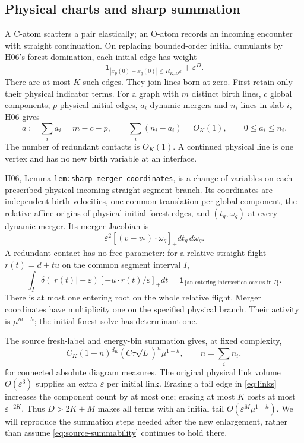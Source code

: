 \documentclass[11pt]{article}
\newcommand{\eps}{\varepsilon}
\newcommand{\ind}{\mathbf1}
\newcommand{\dd}{\,d}
\theoremstyle{definition}\newtheorem{definition}[theorem]{Definition}
\theoremstyle{remark}\newtheorem{remark}[theorem]{Remark}
\numberwithin{equation}{section}
\begin{document}
\subsection{Physical charts and sharp summation}\label{subsec:charts}
A C-atom scatters a pair elastically; an O-atom records an incoming encounter
with straight continuation. On replacing bounded-order initial cumulants
by H06's forest domination, each initial edge has weight
\begin{equation}\label{eq:links}
 \ind_{|x_p(0)-x_q(0)|\le R_{K,D}\eps}+\eps^D.
\end{equation}
There are at most $K$ such edges. They join lines born at zero.
First retain only their physical indicator terms. For a graph with $m$
distinct birth lines, $c$ global components, $p$ physical initial edges,
$a_i$ dynamic mergers and $n_i$ lines in slab $i$, H06 gives
\begin{equation}\label{eq:forestcounts}
 a:=\sum_i a_i=m-c-p,\qquad
 \sum_i(n_i-a_i)=O_K(1),\qquad 0\le a_i\le n_i.
\end{equation}
The number of redundant contacts is $O_K(1)$. A continued physical line
is one vertex and has no new birth variable at an interface.

H06, Lemma \texttt{lem:sharp-merger-coordinates}, is a change of variables
on each prescribed physical incoming straight-segment branch. Its coordinates
are independent birth velocities, one common translation per global
component, the relative affine origins of physical initial forest edges,
and $(t_g,\omega_g)$ at every dynamic merger. Its merger Jacobian is
\begin{equation}\label{eq:jacobian}
 \eps^2[(v-v_*)\cdot\omega_g]_+dt_g\dd\omega_g.
\end{equation}
A redundant contact has no free parameter: for a relative straight flight
$r(t)=d+tu$ on the common segment interval $I$,
\begin{equation}\label{eq:redundant}
 \int_I\delta(|r(t)|-\eps)[-u\cdot r(t)/\eps]_+dt
   =\ind_{\{\text{an entering intersection occurs in }I\}}.
\end{equation}
There is at most one entering root on the whole relative flight. Merger
coordinates have multiplicity one on the specified physical branch. Their
activity is $\mu^{m-h}$; the initial forest solve has determinant one.

The source fresh-label and energy-bin summation gives, at fixed complexity,
\begin{equation}\label{eq:source-summability}
 C_K(1+n)^{d_K}(C\tau\sqrt L)^n\mu^{1-h},\qquad n=\sum_i n_i,
\end{equation}
for connected absolute diagram measures. The original physical link volume
$O(\eps^3)$ supplies an extra $\eps$ per initial link. Erasing a tail edge
in \eqref{eq:links} increases the component count by at most one; erasing
at most $K$ costs at most $\eps^{-2K}$. Thus $D>2K+M$ makes all terms with
an initial tail $O(\eps^M\mu^{1-h})$. We will reproduce the summation steps
needed after the new enlargement, rather than assume
\eqref{eq:source-summability} continues to hold there.
\end{document}
